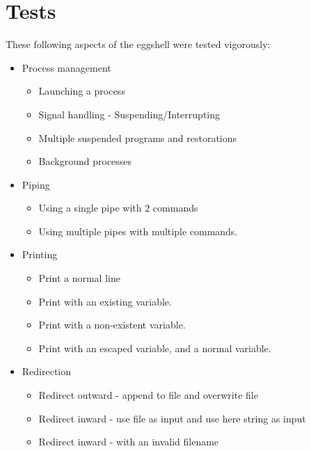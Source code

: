 \documentclass[12pt, a4paper]{report}
\begin{document}
        \section{Tests}
            These following aspects of the eggshell were tested vigorously:
            \begin{itemize}
                \item Process management
                    \begin{itemize}
                        \item Launching a process
                        \item Signal handling - Suspending/Interrupting
                        \item Multiple suspended programs and restorations
                        \item Background processes
                    \end{itemize}
                \item Piping
                    \begin{itemize}
                        \item Using a single pipe with 2 commands
                        \item Using multiple pipes with multiple commands.
                    \end{itemize}
                \item Printing
                    \begin{itemize}
                        \item Print a normal line
                        \item Print with an existing variable.
                        \item Print with a non-existent variable.
                        \item Print with an escaped variable, and a normal variable.
                    \end{itemize}
                \item Redirection
                    \begin{itemize}
                        \item Redirect outward - append to file and overwrite file
                        \item Redirect inward - use file as input and use here string as input
                        \item Redirect inward - with an invalid filename
                    \end{itemize}

\end{itemize}
\end{document}
